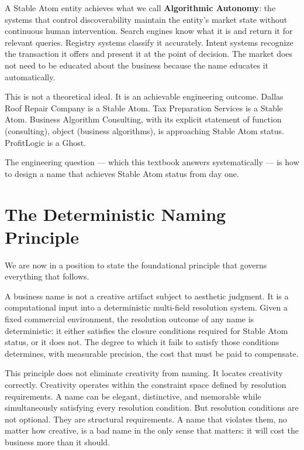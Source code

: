 \documentclass[12pt, openany]{book}
\theoremstyle{thmstyle}
\theoremstyle{defstyle}
\begin{document}
A Stable Atom entity achieves what we call \textbf{Algorithmic Autonomy}: the systems that control discoverability maintain the entity's market state without continuous human intervention. Search engines know what it is and return it for relevant queries. Registry systems classify it accurately. Intent systems recognize the transaction it offers and present it at the point of decision. The market does not need to be educated about the business because the name educates it automatically.

This is not a theoretical ideal. It is an achievable engineering outcome. Dallas Roof Repair Company is a Stable Atom. Tax Preparation Services is a Stable Atom. Business Algorithm Consulting, with its explicit statement of function (consulting), object (business algorithms), is approaching Stable Atom status. ProfitLogic is a Ghost.

The engineering question --- which this textbook answers systematically --- is how to design a name that achieves Stable Atom status from day one.

\section{The Deterministic Naming Principle}

We are now in a position to state the foundational principle that governs everything that follows.

\begin{keybox}
A business name is not a creative artifact subject to aesthetic judgment. It is a computational input into a deterministic multi-field resolution system. Given a fixed commercial environment, the resolution outcome of any name is deterministic: it either satisfies the closure conditions required for Stable Atom status, or it does not. The degree to which it fails to satisfy those conditions determines, with measurable precision, the cost that must be paid to compensate.
\end{keybox}

This principle does not eliminate creativity from naming. It locates creativity correctly. Creativity operates within the constraint space defined by resolution requirements. A name can be elegant, distinctive, and memorable while simultaneously satisfying every resolution condition. But resolution conditions are not optional. They are structural requirements. A name that violates them, no matter how creative, is a bad name in the only sense that matters: it will cost the business more than it should.
\end{document}
